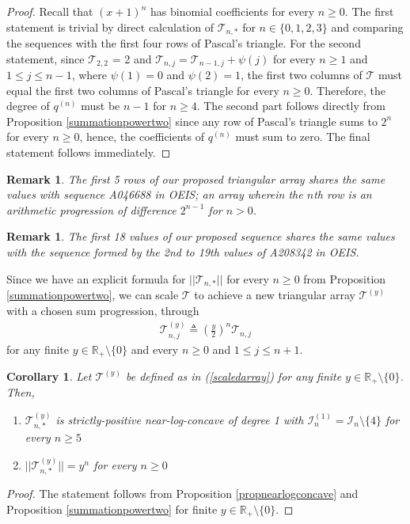 \documentclass[a4paper,12pt]{article}
\newtheorem{coro}[thm]{Corollary}
\newtheorem{rem}[thm]{Remark}
\def\R{\mathbb{R}}
\def\T{\mathcal{T}}
\begin{document}
\begin{proof}
Recall that $(x+1)^n$ has binomial coefficients for every $n\geq0$. The first statement is trivial by direct calculation of $\T_{n,*}$ for $n\in\{0,1,2,3\}$ and comparing the sequences with the first four rows of Pascal's triangle. For the second statement, since  $\T_{2,2}$ = 2 and $\T_{n,j} = \T_{n-1,j} + \psi(j)$ for every $n \geq 1$ and $1 \leq j \leq n-1$, where $\psi(1) = 0$ and $\psi(2) = 1$, the first two columns of $\T$ must equal the first two columns of Pascal's triangle for every $n\geq 0$. Therefore, the degree of $q^{(n)}$ must be $n-1$ for $n\geq4$. The second part follows directly from Proposition \ref{summationpowertwo} since any row of Pascal's triangle sums to $2^n$ for every $n\geq 0$, hence, the coefficients of $q^{(n)}$ must sum to zero. The final statement follows immediately.
\end{proof}
\begin{rem}
The first 5 rows of our proposed triangular array shares the same values with sequence A046688 in OEIS; an array wherein the $n$th row is an arithmetic progression of difference $2^{n-1}$ for $n > 0$. 
\end{rem}
\begin{rem}
The first 18 values of our proposed sequence shares the same values with the sequence formed by the 2nd to 19th values of A208342 in OEIS.
\end{rem}
Since we have an explicit formula for $||\T_{n,*}||$ for every $n\geq 0$ from Proposition \ref{summationpowertwo}, we can scale $\T$ to achieve a new triangular array $\T^{(y)}$ with a chosen sum progression, through
\begin{align}
\T^{(y)}_{n,j} \triangleq \left(\frac{y}{2}\right)^n\T_{n,j} \label{scaledarray}
\end{align}
for any finite $y\in\R_+\setminus\{0\}$ and every $n\geq 0$ and $1 \leq j \leq n+1$.
\begin{coro}
\label{scaledarrayprogressopn}
Let $\T^{(y)}$ be defined as in (\ref{scaledarray}) for any finite $y\in\R_+\setminus\{0\}$. Then, 
\begin{enumerate}
\item $\T^{(y)}_{n,*}$ is strictly-positive \emph{near}-log-concave of degree 1 with $\mathcal{I}_{n}^{(1)} = \mathcal{I}_{n}\setminus\{4\}$ for every $n\geq 5$ \item $||\T^{(y)}_{n,*}|| = y^{n}$ for every $n\geq 0$
\end{enumerate}
\end{coro}
\begin{proof}
The statement follows from Proposition \ref{propnearlogconcave} and Proposition \ref{summationpowertwo} for finite $y\in\R_+\setminus\{0\}$.
\end{proof}
\end{document}
